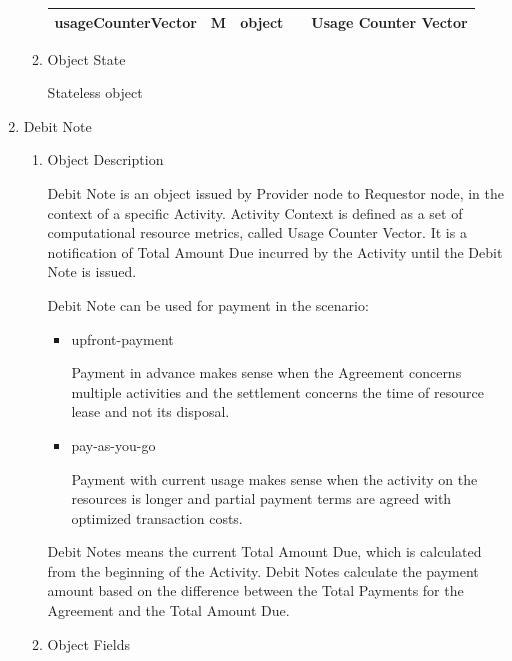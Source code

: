 \begin{enumerate}
\begin{enumerate}
\begin{center}
\begin{tabular}{|p{3cm}|l|p{3cm}|p{3cm}|p{4cm}|}
usageCounterVector	& M & object				&							&  Usage Counter Vector \\
\hline

\end{tabular}
\end{center}

\item Object State

Stateless object

\end{enumerate}

\item Debit Note

\begin{enumerate}

\item Object Description

Debit Note is an object issued by Provider node to Requestor node, in the context of a specific Activity.
Activity Context is defined as a set of computational resource metrics, called Usage Counter Vector.
It is a notification of Total Amount Due incurred by the Activity until the Debit Note is issued.


Debit Note can be used for payment in the scenario:

\begin{itemize}

\item upfront-payment

Payment in advance makes sense when the Agreement concerns multiple activities and 
the settlement concerns the time of resource lease and not its disposal.

\item pay-as-you-go

Payment with current usage makes sense when the activity on the resources is longer and partial payment terms 
are agreed with optimized transaction costs.

\end{itemize}

Debit Notes means the current Total Amount Due, which is calculated from the beginning of the Activity.
Debit Notes calculate the payment amount based on the difference between the Total Payments 
for the Agreement and the Total Amount Due.

\item Object Fields


\end{enumerate}
\end{enumerate}
